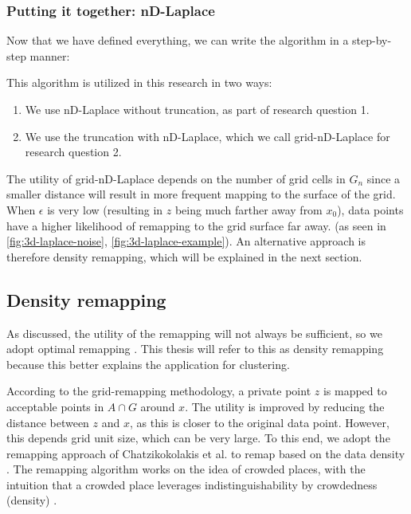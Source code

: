 \subsubsection{Putting it together: nD-Laplace}
Now that we have defined everything, we can write the algorithm in a step-by-step manner:

This algorithm is utilized in this research in two ways:
\begin{enumerate}
    \item We use nD-Laplace without truncation, as part of research question 1.
    \item We use the truncation with nD-Laplace, which we call grid-nD-Laplace for research question 2.
\end{enumerate}

The utility of grid-nD-Laplace depends on the number of grid cells in $G_n$ since a smaller distance will result in more frequent mapping to the surface of the grid.
When $\epsilon$ is very low (resulting in $z$ being much farther away from $x_0$), data points have a higher likelihood of remapping to the grid surface far away.
(as seen in \ref{fig:3d-laplace-noise}, \ref{fig:3d-laplace-example}). 
An alternative approach is therefore density remapping, which will be explained in the next section.
\newpage
\subsection{Density remapping} \label{theory:optimal-remapping}
As discussed, the utility of the remapping will not always be sufficient, so we adopt optimal remapping \citep{chatzikokolakis_efficient_2017}.
This thesis will refer to this as density remapping because this better explains the application for clustering.

According to the grid-remapping methodology, a private point $z$ is mapped to acceptable points in $A \cap G$ around $x$.
The utility is improved by reducing the distance between $z$ and $x$, as this is closer to the original data point.
However, this depends  grid unit size, which can be very large.
To this end, we adopt the remapping approach of Chatzikokolakis et al. to remap based on the data density \citep{chatzikokolakis_efficient_2017}.
The remapping algorithm works on the idea of crowded places, with the intuition that a crowded place leverages indistinguishability by crowdedness (density) \citep{chatzikokolakis_efficient_2017}.  \newline

